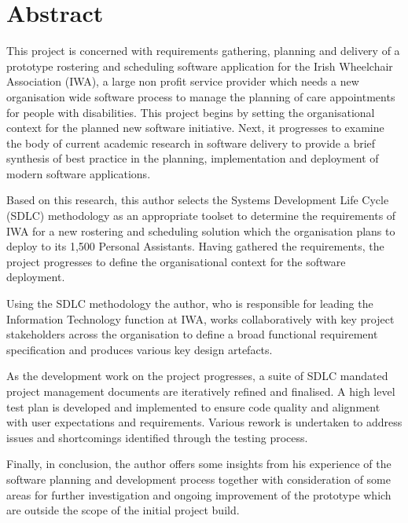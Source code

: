 \documentclass[a4paper,Times New Roman 11pt]{article}
\begin{document}
\section*{Abstract}

This project is concerned with requirements gathering, planning and delivery of a prototype rostering and scheduling software application for the Irish Wheelchair Association (IWA), a large non profit service provider which needs a new organisation wide software process to manage the planning of care appointments for people with disabilities. This project begins by setting the organisational context for the planned new software initiative. Next, it progresses to examine the body of current academic research in software delivery to provide a brief synthesis of best practice in the planning, implementation and deployment of modern software applications.

Based on this research, this author selects the Systems Development Life Cycle (SDLC) methodology as an appropriate toolset to determine the requirements of IWA for a new rostering and scheduling solution which the organisation plans to deploy to its 1,500 Personal Assistants. Having gathered the requirements, the project progresses to define the organisational context for the software deployment.

Using the SDLC methodology the author, who is responsible for leading the Information Technology function at IWA, works collaboratively with key project stakeholders across the organisation to define a broad functional requirement specification and produces various key design artefacts.

As the development work on the project progresses, a suite of SDLC mandated project management documents are iteratively refined and finalised. A high level test plan is developed and implemented to ensure code quality and alignment with user expectations and requirements. Various rework is undertaken to address issues and shortcomings identified through the testing process.

Finally, in conclusion, the author offers some insights from his experience of the software planning and development process together with consideration of some areas for further investigation and ongoing improvement of the prototype which are outside the scope of the initial project build.
\end{document}
